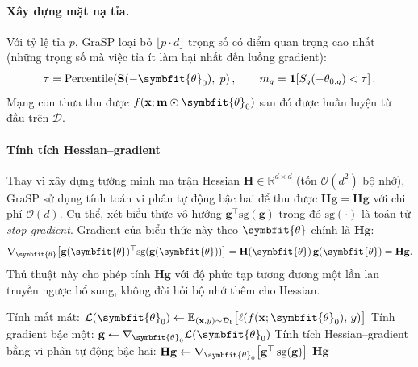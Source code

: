 \paragraph{\textbf{Xây dựng mặt nạ tỉa.}\cite{grasp}}
Với tỷ lệ tỉa $p$, GraSP loại bỏ $\lfloor p \cdot d \rfloor$ trọng số có
điểm quan trọng cao nhất (những trọng số mà việc tỉa ít làm hại
nhất đến luồng gradient):
\begin{equation}
    \tau = \mathrm{Percentile}\!\left(\mathbf{S}(-\symbfit{\theta}_0),\; p\right),
    \qquad
    m_q = \mathbf{1}\!\left[S_q(-\theta_{0,q}) < \tau\right].
    \label{eq:mask}
\end{equation}
Mạng con thưa thu được $f(\mathbf{x};\mathbf{m}\odot\symbfit{\theta}_0)$ sau đó
được huấn luyện từ đầu trên $\mathcal{D}$.

\paragraph{\textbf{Tính tích Hessian--gradient}\cite{grasp}}
Thay vì xây dựng tường minh ma trận Hessian $\mathbf{H} \in \mathbb{R}^{d\times d}$
(tốn $\mathcal{O}(d^2)$ bộ nhớ), GraSP sử dụng tính toán vi phân tự động bậc hai
để thu được $\mathbf{Hg} = \mathbf{H}\mathbf{g}$ với chi phí $\mathcal{O}(d)$.
Cụ thể, xét biểu thức vô hướng $\mathbf{g}^\top \mathrm{sg}(\mathbf{g})$
trong đó $\mathrm{sg}(\cdot)$ là toán tử \textit{stop-gradient}.
Gradient của biểu thức này theo $\symbfit{\theta}$ chính là $\mathbf{Hg}$:
\begin{equation}
    \nabla_{\symbfit{\theta}}
    \!\left[\mathbf{g}(\symbfit{\theta})^\top
        \mathrm{sg}\!\left(\mathbf{g}(\symbfit{\theta})\right)\right]
    = \mathbf{H}(\symbfit{\theta})\,\mathbf{g}(\symbfit{\theta}) = \mathbf{Hg}.
    \label{eq:hg_trick}
\end{equation}
Thủ thuật này cho phép tính $\mathbf{Hg}$ với độ phức tạp tương đương
một lần lan truyền ngược bổ sung, không đòi hỏi bộ nhớ thêm cho Hessian.

\begin{algorithm}[H]
    \caption{Tính tích Hessian--gradient ($\mathbf{Hg}$)}
    \label{alg:hg}
    \DontPrintSemicolon
    \SetAlgoLined
    \BlankLine
    Tính mất mát:
    $\mathcal{L}(\symbfit{\theta}_0)
        \leftarrow \mathbb{E}_{(\mathbf{x},y)\sim\mathcal{D}_b}
        \bigl[\ell(f(\mathbf{x};\symbfit{\theta}_0),\, y)\bigr]$\;
    \BlankLine
    Tính gradient bậc một:
    $\mathbf{g} \leftarrow \nabla_{\symbfit{\theta}_0}\mathcal{L}(\symbfit{\theta}_0)$\;
    \BlankLine
    Tính tích Hessian--gradient bằng vi phân tự động bậc hai:
    $\mathbf{Hg} \leftarrow
        \nabla_{\symbfit{\theta}_0}
        \!\left[\mathbf{g}^{\top}\,\mathrm{sg}(\mathbf{g})\right]$
    \BlankLine
    \Return $\mathbf{Hg}$\;
\end{algorithm}

